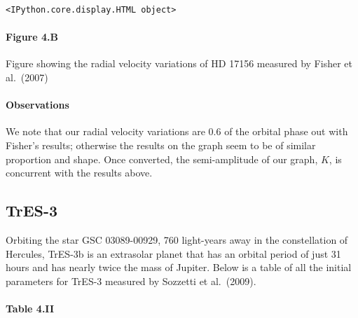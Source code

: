 \documentclass[11pt]{article}
\begin{document}
    
    
    \begin{Verbatim}[commandchars=\\\{\}]
<IPython.core.display.HTML object>
    \end{Verbatim}

    
    

    \hypertarget{figure-4.b}{%
\paragraph{Figure 4.B}\label{figure-4.b}}

Figure showing the radial velocity variations of HD 17156 measured by
Fisher et al.~(2007)

    \hypertarget{observations}{%
\paragraph{Observations}\label{observations}}

We note that our radial velocity variations are 0.6 of the orbital phase
out with Fisher's results; otherwise the results on the graph seem to be
of similar proportion and shape. Once converted, the semi-amplitude of
our graph, \(K\), is concurrent with the results above.


\hypertarget{tres-3}{%
\subsection{TrES-3}\label{tres-3}}

Orbiting the star GSC 03089-00929, 760 light-years away in the
constellation of Hercules, TrES-3b is an extrasolar planet that has an
orbital period of just 31 hours and has nearly twice the mass of
Jupiter. Below is a table of all the initial parameters for TrES-3
measured by Sozzetti et al.~(2009).

    \hypertarget{table-4.ii}{%
\paragraph{Table 4.II}\label{table-4.ii}}
\end{document}
